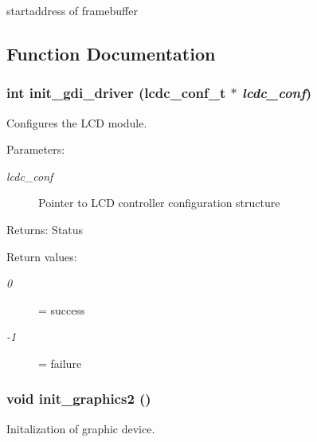startaddress of framebuffer 

\subsection{Function Documentation}
\hypertarget{group__ap7000__lcd_gdaab935823d9ec8447c28b6c56b221c4}{
\subsubsection[{init\_\-gdi\_\-driver}]{\setlength{\rightskip}{0pt plus 5cm}int init\_\-gdi\_\-driver ({\bf lcdc\_\-conf\_\-t} $\ast$ {\em lcdc\_\-conf})}}
\label{group__ap7000__lcd_gdaab935823d9ec8447c28b6c56b221c4}


Configures the LCD module. 

\begin{Desc}
\item[Parameters:]
\begin{description}
\item[{\em lcdc\_\-conf}]Pointer to LCD controller configuration structure\end{description}
\end{Desc}
\begin{Desc}
\item[Returns:]Status \end{Desc}
\begin{Desc}
\item[Return values:]
\begin{description}
\item[{\em 0}]= success \item[{\em -1}]= failure \end{description}
\end{Desc}
\hypertarget{group__ap7000__lcd_g8ce36407397a9552d2fc31dc420161c8}{
\subsubsection[{init\_\-graphics2}]{\setlength{\rightskip}{0pt plus 5cm}void init\_\-graphics2 ()}}
\label{group__ap7000__lcd_g8ce36407397a9552d2fc31dc420161c8}


Initalization of graphic device. 

